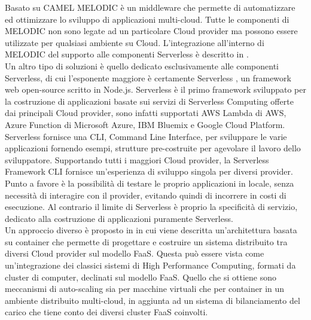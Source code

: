 Basato su CAMEL MELODIC \cite{MELODIC} è un middleware che permette di automatizzare ed ottimizzare lo sviluppo di applicazioni multi-cloud. Tutte le componenti di MELODIC non sono legate ad un particolare Cloud provider ma possono essere utilizzate per qualsiasi ambiente su Cloud. L'integrazione all'interno di MELODIC del supporto alle componenti Serverless è descritto in \citet{ServerlessMultiCloud}. \\
Un altro tipo di soluzioni è quello dedicato esclusivamente alle componenti Serverless, di cui l’esponente maggiore è certamente Serverless \cite{ServerlessSite}, un framework web open-source scritto in Node.js. Serverless è il primo framework sviluppato per la costruzione di applicazioni basate sui servizi di Serverless Computing offerte dai principali Cloud provider, sono infatti supportati AWS Lambda di AWS, Azure Function di Microsoft Azure, IBM Bluemix e Google Cloud Platform. Serverless fornisce una CLI, Command Line Interface, per sviluppare le varie applicazioni fornendo esempi, strutture pre-costruite per agevolare il lavoro dello sviluppatore. Supportando tutti i maggiori Cloud provider, la Serverless Framework CLI fornisce un’esperienza di sviluppo singola per diversi provider. Punto a favore è la possibilità di testare le proprio applicazioni in locale, senza necessità di interagire con il provider, evitando quindi di incorrere in costi di esecuzione. Al contrario il limite di Serverless è proprio la specificità di servizio, dedicato alla costruzione di applicazioni puramente Serverless. \\
Un approccio diverso è proposto in \citet{DistributedFaas} in cui viene descritta un’architettura basata su container che permette di progettare e costruire un sistema distribuito tra diversi Cloud provider sul modello FaaS. Questa può essere vista come un’integrazione dei classici sistemi di High Performance Computing, formati da cluster di computer, declinati sul modello FaaS. Quello che si ottiene sono meccanismi di auto-scaling sia per macchine virtuali che per container in un ambiente distribuito multi-cloud, in aggiunta ad un sistema di bilanciamento del carico che tiene conto dei diversi cluster FaaS coinvolti. 
